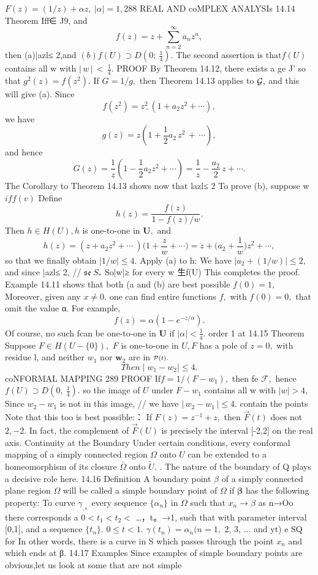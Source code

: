 $F(z)=(1/z)+\alpha z,\ |\alpha|=1,$288 REAL AND coMPLEX ANALYSIs 14.14 Theorem Iff∈ J9, and $$ f(z)=z+\sum_{n=2}^{\infty}a_{n}z^{n}, $$ then (a)|azl≤ 2,and $(b)f(U)\supset D(0;\ {\textstyle\frac{1}{4}}).$ The second assertion is $\mathrm{that}f(U)$ contains all w with $|\,w\,|\,<\,{\frac{1}{4}}.$ PROOF By Theorem 14.12, there exists a ge J’ so that $g^{2}(z)=f(z^{2}).$ If $G=1/g,$ then Theorem 14.13 applies to ${\cal G},$ and this will give (a). Since $$ f(z^{2})=z_{-}^{2}(1+a_{2}z^{2}+\cdots), $$ we have $$ g(z)=z(1+{\textstyle{\frac{1}{2}}}a_{2}\,z^{2}\,+\,\cdots), $$ and hence $$ G(z)=\frac{1}{z}\left(1-\frac{1}{2}a_{2}z^{2}+\cdots\right)=\frac{1}{z}-\frac{a_{2}}{2}\,z+\cdots. $$ The Corollary to Theorem 14.13 shows now that lazl≤ 2 To prove (b), suppose w $\scriptstyle{i f f(v)}$ Define $$ h(z)=\frac{f(z)}{1-f(z)/w}. $$ Then $h\in H(U),h$ is one-to-one in ${\boldsymbol{U}},$ and $$ h(z)=(z+a_{2}z^{2}+\cdots\ )\biggl(1+{\frac{z}{w}}+\cdots\biggr)=z+\biggl(a_{2}+{\frac{1}{w}}\biggr)z^{2}+\cdots, $$ so that we finally obtain $|1/w|\leq4.$ Apply (a) to h: We have $|a_{2}+(1/w)|\leq2,$ and since |azl≤ 2, // ${\mathfrak{s e}}\ S_{*}$ So|w|≥ for every w 生f(U) This completes the proof. Example 14.11 shows that both (a and (b) are best possible $f(0)=1,$ Moreover, given any $\scriptstyle x\neq0.$ one can find entire functions $f,$ with $f(0)=0,$ that omit the value α. For example, $$ f(z)=\alpha(1-e^{-z/\alpha}). $$ Of course, no such fcan be one-to-one in ${\boldsymbol{U}}$ if $|\alpha|<\frac{1}{4}.$ order 1 at 14.15 Theorem Suppose $F\in H(U-\{0\}),$ ${\mathbf{}}F$ is one-to-one in $U,F$ has a pole of $\scriptstyle z=0,$ with residue l, and neither $w_{1}$ nor ${\boldsymbol{w}}_{2}$ are in $\scriptstyle{\cal{P}}(t).$ $$ T h e n\mid w_{1}-w_{2}\mid\leq4. $$coNFORMAL MAPPING 289 PROOF ${\mathrm{If}}f=1/(F-w_{1}),$ then fe ${\mathcal{F}},$ hence $f(U)\supset D(0,\ {\frac{1}{4}}).$ so the image of $U$ under $F-w_{1}$ contains all w with $|w|>4,$ Since $w_{2}-w_{1}$ is not in this image, // we have $|\,w_{2}-w_{1}\,|\leq4.$ contain the points Note that this too is best possible:： If $F(z)=z^{-1}+z,$ then $\scriptstyle{\vec{F}}(t)$ does not $2,-2.$ In fact, the complement of $\scriptstyle{\vec{F}}(U)$ is precisely the interval [-2,2] on the real axis. Continuity at the Boundary Under certain conditions, every conformal mapping of a simply connected region $\Omega$ onto $U$ can be extended to a homeomorphism of its closure $\bar{\Omega}$ onto ${\tilde{U}}.$ . The nature of the boundary of Q plays a decisive role here. 14.16 Definition A boundary point $\beta$ of a simply connected plane region $\Omega$ will be called a simple boundary point of $\Omega$ if $\boldsymbol{\beta}$ has the following property: To curve $\gamma_{\mathrm{,\varepsilon}}$ every sequence $\{\alpha_{n}\}$ in $\Omega$ such that $x_{n}\to\beta$ as n→Oo there corresponds a $0<t_{1}<t_{2}<$ …，t。→1, such that with parameter interval [0,1], and a sequence $\{t_{n}\}.$ $0\leq t<1.$ $\gamma(t_{n})=\alpha_{n}(n=1,$ 2, 3, ... and yt) e SQ for In other words, there is a curve in S which passes through the point $\scriptstyle x_{n}$ and which ends at β. 14.17 Examples Since examples of simple boundary points are obvious,let us look at some that are not simple 